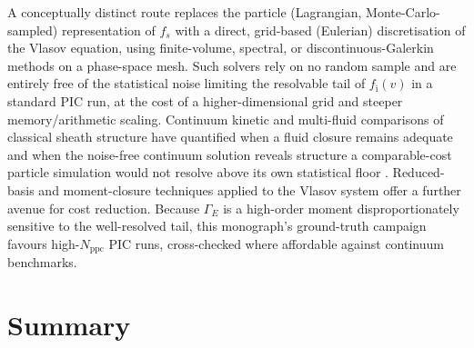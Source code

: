 A conceptually distinct route replaces the particle (Lagrangian, Monte-Carlo-sampled) representation of $f_{s}$ with a direct, grid-based (Eulerian) discretisation of the Vlasov equation, using finite-volume, spectral, or discontinuous-Galerkin methods on a phase-space mesh. Such solvers rely on no random sample and are entirely free of the statistical noise limiting the resolvable tail of $f_{\mathrm{i}}(v)$ in a standard PIC run, at the cost of a higher-dimensional grid and steeper memory/arithmetic scaling. Continuum kinetic and multi-fluid comparisons of classical sheath structure have quantified when a fluid closure remains adequate and when the noise-free continuum solution reveals structure a comparable-cost particle simulation would not resolve above its own statistical floor \cite{ref0659}. Reduced-basis and moment-closure techniques applied to the Vlasov system offer a further avenue for cost reduction. Because $\Gamma_{E}$ is a high-order moment disproportionately sensitive to the well-resolved tail, this monograph's ground-truth campaign favours high-$N_{\mathrm{ppc}}$ PIC runs, cross-checked where affordable against continuum benchmarks.

\section{Summary}

